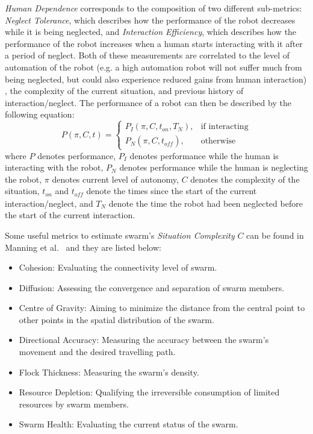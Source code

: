 \documentclass[journal]{IEEEtran}
\begin{document}
\textit{Human Dependence} corresponds to the composition of two different sub-metrics: \textit{Neglect Tolerance}, which describes how the performance of the robot decreases while it is being neglected, and \textit{Interaction Efficiency}, which describes how the performance of the robot increases when a human starts interacting with it after a period of neglect. Both of these measurements are correlated to the level of automation of the robot (e.g. a high automation robot will not suffer much from being neglected, but could also experience reduced gains from human interaction)
 , the complexity of the current situation, and previous history of interaction/neglect. The performance of a robot can then be described by the following equation:
\begin{equation}
  P(\pi,C,t)=
  \begin{cases}
    P_I(\pi,C,t_\textit{on},T_N), & \text{if interacting}\\
    P_N(\pi,C,t_\textit{off}),    & \text{otherwise}
  \end{cases}
\end{equation}
where $P$ denotes performance, $P_I$ denotes performance while the human is interacting with the robot, $P_N$ denotes  performance while the human is neglecting the robot, $\pi$ denotes current level of autonomy, $C$ denotes the complexity of the situation, $t_\textit{on}$ and $t_\textit{off}$ denote the times since the start of the current interaction/neglect, and $T_N$ denote the time the robot had been neglected before the start of the current interaction.

Some useful metrics to estimate swarm's \textit{Situation Complexity} $C$ can be found in Manning et al.~\cite{manning2015heuristic} and they are listed below: 

\begin{itemize}
\item Cohesion: Evaluating the connectivity level of swarm.
\item Diffusion: Assessing the convergence and separation of swarm members.
\item Centre of Gravity: Aiming to minimize the distance from the central point to other points in the spatial distribution of the swarm.
\item Directional Accuracy: Measuring the accuracy between the swarm\textquoteright s movement and the desired travelling path.
\item Flock Thickness: Measuring the swarm\textquoteright s density.
\item Resource Depletion: Qualifying the irreversible consumption of limited resources by swarm members.
\item Swarm Health: Evaluating the current status of the swarm.
\end{itemize}
\end{document}

